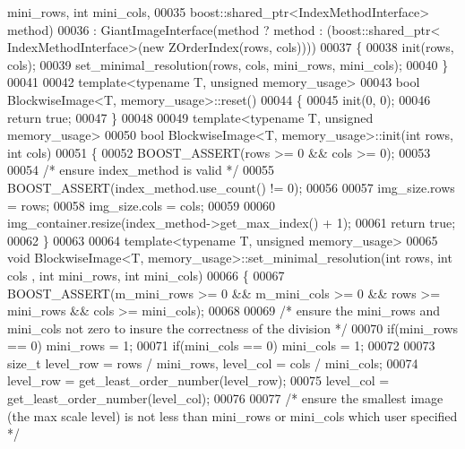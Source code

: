 \begin{DoxyCode}
      mini\_rows, \textcolor{keywordtype}{int} mini\_cols, 
00035         boost::shared\_ptr<IndexMethodInterface> method)
00036         : GiantImageInterface(method ? method : (boost::shared\_ptr<
      IndexMethodInterface>(new ZOrderIndex(rows, cols))))
00037 \{
00038         init(rows, cols);
00039         set_minimal_resolution(rows, cols, mini\_rows, mini\_cols);
00040 \}
00041 
00042 \textcolor{keyword}{template}<\textcolor{keyword}{typename} T, \textcolor{keywordtype}{unsigned} memory\_usage>
00043 \textcolor{keywordtype}{bool} BlockwiseImage<T, memory_usage>::reset()
00044 \{
00045         init(0, 0);
00046         \textcolor{keywordflow}{return} \textcolor{keyword}{true};
00047 \}
00048 
00049 \textcolor{keyword}{template}<\textcolor{keyword}{typename} T, \textcolor{keywordtype}{unsigned} memory\_usage>
00050 \textcolor{keywordtype}{bool} BlockwiseImage<T, memory_usage>::init(\textcolor{keywordtype}{int} rows, \textcolor{keywordtype}{int} cols)
00051 \{
00052         BOOST\_ASSERT(rows >= 0 && cols >= 0);
00053 
00054         \textcolor{comment}{/* ensure index\_method is valid */}
00055         BOOST\_ASSERT(index\_method.use\_count() != 0);
00056 
00057         img\_size.rows = rows;
00058         img\_size.cols = cols;
00059 
00060         img\_container.resize(index\_method->get\_max\_index() + 1);
00061         \textcolor{keywordflow}{return} \textcolor{keyword}{true};
00062 \}
00063 
00064 \textcolor{keyword}{template}<\textcolor{keyword}{typename} T, \textcolor{keywordtype}{unsigned} memory\_usage>
00065 \textcolor{keywordtype}{void} BlockwiseImage<T, memory_usage>::set_minimal_resolution(\textcolor{keywordtype}{int} rows, \textcolor{keywordtype}{int} cols
      , \textcolor{keywordtype}{int} mini\_rows, \textcolor{keywordtype}{int} mini\_cols)
00066 \{
00067         BOOST\_ASSERT(m\_mini\_rows >= 0 && m\_mini\_cols >= 0 && rows >= mini\_rows 
      && cols >= mini\_cols);
00068 
00069         \textcolor{comment}{/* ensure the mini\_rows and mini\_cols not zero to insure the
       correctness of the division */}
00070         \textcolor{keywordflow}{if}(mini\_rows == 0)      mini\_rows = 1;
00071         \textcolor{keywordflow}{if}(mini\_cols == 0)      mini\_cols = 1;
00072 
00073         \textcolor{keywordtype}{size\_t} level\_row = rows / mini\_rows, level\_col = cols / mini\_cols;
00074         level\_row = get\_least\_order\_number(level\_row);
00075         level\_col = get\_least\_order\_number(level\_col);
00076 
00077         \textcolor{comment}{/* ensure the smallest image (the max scale level) is not less than
       mini\_rows or mini\_cols which user specified */}

\end{DoxyCode}

